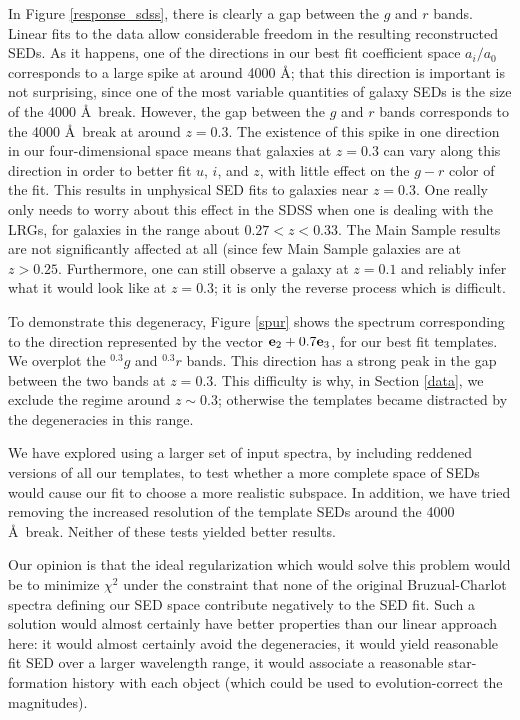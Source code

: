 \documentclass[10pt,preprint]{aastex}
\newcommand{\vv}[1]{{\bf #1}}
\newcommand{\band}[2]{\ensuremath{^{{#1}}\!{#2}}}
\begin{document}
In Figure \ref{response_sdss}, there is clearly a gap between the $g$
and $r$ bands. Linear fits to the data allow considerable freedom in
the resulting reconstructed SEDs. As it happens, one of the directions
in our best fit coefficient space $a_i/a_0$ corresponds to a large
spike at around 4000 \AA; that this direction is important is not
surprising, since one of the most variable quantities of galaxy SEDs
is the size of the 4000 \AA\ break. However, the gap between the $g$
and $r$ bands corresponds to the 4000 \AA\ break at around
$z=0.3$. The existence of this spike in one direction in our
four-dimensional space means that galaxies at $z=0.3$ can vary along
this direction in order to better fit $u$, $i$, and $z$, with little
effect on the $g-r$ color of the fit. This results in unphysical SED
fits to galaxies near $z=0.3$.  One really only needs to worry about
this effect in the SDSS when one is dealing with the LRGs, for
galaxies in the range about $0.27 < z < 0.33$. The Main Sample results
are not significantly affected at all (since few Main Sample galaxies
are at $z>0.25$.  Furthermore, one can still observe a galaxy at
$z=0.1$ and reliably infer what it would look like at $z=0.3$; it is
only the reverse process which is difficult.

To demonstrate this degeneracy, Figure \ref{spur} shows the spectrum
corresponding to the direction represented by the vector $ \vv{e}_2 +
0.7 \vv{e}_3$, for our best fit templates. We overplot the
\band{0.3}{g} and \band{0.3}{r} bands. This direction has a strong
peak in the gap between the two bands at $z=0.3$.  This difficulty is
why, in Section \ref{data}, we exclude the regime around $z\sim 0.3$;
otherwise the templates became distracted by the degeneracies in this
range.

We have explored using a larger set of input spectra, by including
reddened versions of all our templates, to test whether a more
complete space of SEDs would cause our fit to choose a more realistic
subspace. In addition, we have tried removing the increased resolution
of the template SEDs around the 4000 \AA\ break. Neither of these
tests yielded better results.

Our opinion is that the ideal regularization which would solve this
problem would be to minimize $\chi^2$ under the constraint that none
of the original Bruzual-Charlot spectra defining our SED space
contribute negatively to the SED fit. Such a solution would almost
certainly have better properties than our linear approach here: it
would almost certainly avoid the degeneracies, it would yield
reasonable fit SED over a larger wavelength range, it would associate
a reasonable star-formation history with each object (which could be
used to evolution-correct the magnitudes).
\end{document}
